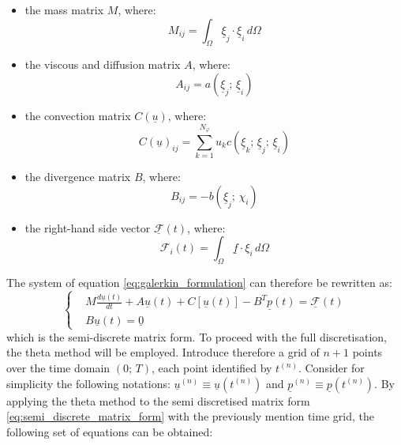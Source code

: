 \documentclass[11pt,a4paper]{article}
\renewcommand{\vec}[1]{\underline{#1}} %
\begin{document}
\begin{itemize}
    \item the mass matrix $M$, where:
    \begin{equation*}
        M_{ij} = \int_{\Omega} \vec{\xi}_{j} \cdot \vec{\xi}_{i} \, d\Omega
    \end{equation*}
    \item the viscous and diffusion matrix $A$, where: 
    \begin{equation*}
        A_{ij} = a \left(\vec{\xi}_{j}; \, \vec{\xi}_{i} \right)
    \end{equation*}
    \item the convection matrix $C(\vec{u})$, where: 
    \begin{equation*}
        C(\vec{u})_{ij} = \sum_{k = 1}^{N_{\varphi}} u_{k} c \left(\vec{\xi}_{k}; \, \vec{\xi}_{j}; \, \vec{\xi}_{i} \right)
    \end{equation*}
    \item the divergence matrix $B$, where: 
    \begin{equation*}
        B_{ij} = - b(\vec{\xi}_{j}; \, \chi_{i})
    \end{equation*}
    \item the right-hand side vector $\vec{\mathcal{F}}(t)$, where: 
    \begin{equation*}
        \mathcal{F}_{i}(t) = \int_{\Omega} \vec{f} \cdot \xi_{i} \, d\Omega
    \end{equation*}
\end{itemize}
The system of equation \eqref{eq:galerkin_formulation} can therefore be rewritten as: 
\begin{equation}
    \label{eq:semi_discrete_matrix_form}
    \left\{ \begin{aligned}
        &M \frac{d \vec{u}(t)}{dt} + A \vec{u}(t) + C[\vec{u}(t)] - B^{T} \vec{p}(t) = \vec{\mathcal{F}}(t) \\
        &B \vec{u}(t) = \vec{0}
    \end{aligned} \right.
\end{equation}
which is the semi-discrete matrix form.
To proceed with the full discretisation, the theta method will be employed. Introduce therefore a grid of $n + 1$ points over the time domain $(0; \, T)$, each point identified by $t^{(n)}$. Consider for simplicity the following notations: $\vec{u}^{(n)} \equiv \vec{u}\left( t^{(n)}\right)$ and $\vec{p}^{(n)} \equiv \vec{p}\left( t^{(n)}\right)$. By applying the theta method to the semi discretised matrix form \eqref{eq:semi_discrete_matrix_form} with the previously mention time grid, the following set of equations can be obtained: 
\end{document}
